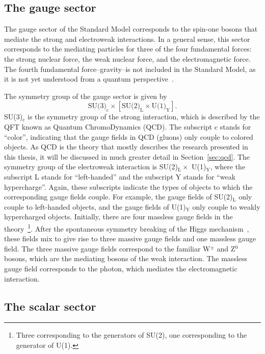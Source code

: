 \subsection{The gauge sector}
\label{sec:gauge_fields}

The gauge sector of the Standard Model corresponds to the spin-one bosons that mediate the strong and electroweak interactions. In a general sense, this sector corresponds to the mediating particles for three of the four fundamental forces: the strong nuclear force, the weak nuclear force, and the electromagnetic force. The fourth fundamental force--gravity--is not included in the Standard Model, as it is not yet understood from a quantum perspective~\cite{QuantumGravity}.

The symmetry group of the gauge sector is given by
%
\begin{equation}
    \label{eq:gauge_symmetry}
    \text{SU(3)}_\text{c} \times \left[\text{SU(2)}_\text{L} \times \text{U(1)}_\text{Y}\right].
\end{equation}
%
SU(3)$_\text{c}$ is the symmetry group of the strong interaction, which is described by the QFT known as Quantum ChromoDynamics (QCD). The subscript c stands for ``color'', indicating that the gauge fields in QCD (gluons) only couple to colored objects. As QCD is the theory that mostly describes the research presented in this thesis, it will be discussed in much greater detail in Section~\ref{sec:qcd}. The symmetry group of the electroweak interaction is SU(2)$_\text{L} \times$ U(1)$_\text{Y}$, where the subscript L stands for ``left-handed'' and the subscript Y stands for ``weak hypercharge''. Again, these subscripts indicate the types of objects to which the corresponding gauge fields couple. For example, the gauge fields of SU(2)$_\text{L}$ only couple to left-handed objects, and the gauge fields of U(1)$_\text{Y}$ only couple to weakly hypercharged objects. Initially, there are four massless gauge fields in the theory~\footnote{Three corresponding to the generators of SU(2), one corresponding to the generator of U(1).}. After the spontaneous symmetry breaking of the Higgs mechanism~\cite{HiggsMechanism}, these fields mix to give rise to three massive gauge fields and one massless gauge field. The three massive gauge fields correspond to the familiar W$^{\pm}$ and Z$^{0}$ bosons, which are the mediating bosons of the weak interaction. The massless gauge field corresponds to the photon, which mediates the electromagnetic interaction.

\subsection{The scalar sector}
\label{sec:scalar_fields}

